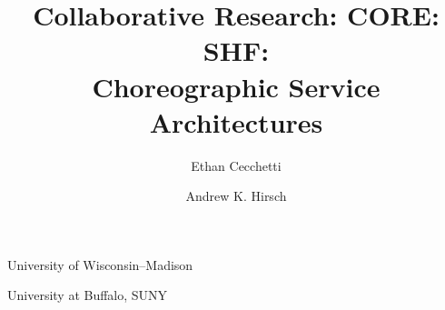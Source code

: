 

\title{Collaborative Research: CORE: SHF: \\ Choreographic Service Architectures}
\author{Ethan Cecchetti}{University of Wisconsin--Madison}
\author{Andrew K. Hirsch}{University at Buffalo, SUNY}

\ifdraft
  \usepackage{fancyhdr}
  \pagestyle{fancy}
  \fancyhf{}
  \def\headrulewidth{0pt}
  \fancyfoot[C]{\thepage}
\else
  \pagestyle{plain}
\fi



\newtheorem{goal}{Goal}


\newpage





